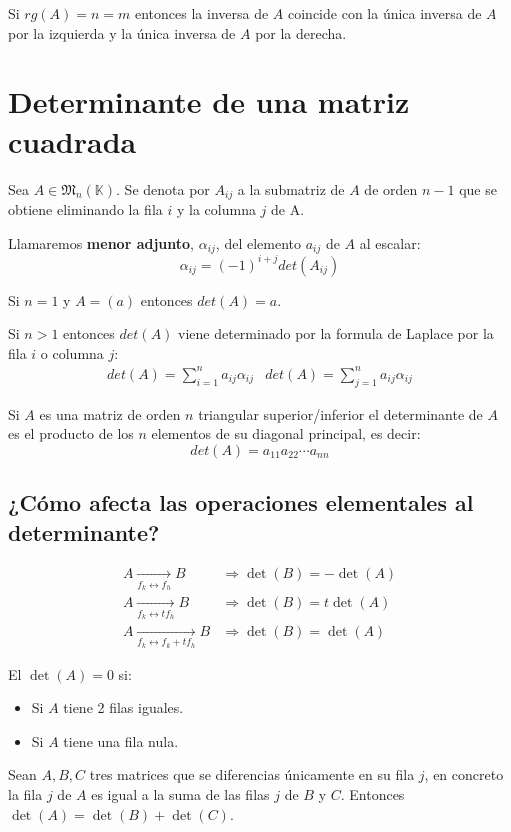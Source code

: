 Si $rg(A)=n=m$ entonces la inversa de $A$ coincide con la única inversa de $A$ por la izquierda y la única inversa de $A$ por la derecha.

\section{Determinante de una matriz cuadrada}

Sea $A \in \mathfrak{M}_n(\mathbb{K})$. Se denota por $A_{ij}$ a la submatriz de $A$ de orden $n-1$ que se obtiene eliminando la fila $i$ y la columna $j$ de A.

Llamaremos \textbf{menor adjunto}, $\alpha_{ij}$, del elemento $a_{ij}$ de $A$ al escalar:
\[
\alpha_{ij} = (-1)^{i+j}det(A_{ij})
\]

Si $n=1$ y $A=(a)$ entonces $det(A)=a$.

Si $n>1$ entonces $det(A)$ viene determinado por la formula de Laplace por la fila $i$ o columna $j$:
\begin{align*}
det(A) = \sum_{i=1}^{n} a_{ij}\alpha_{ij} & det(A) = \sum_{j=1}^{n} a_{ij}\alpha_{ij}
\end{align*}

Si $A$ es una matriz de orden $n$ triangular superior/inferior el determinante de $A$ es el producto de los $n$ elementos de su diagonal principal, es decir:
\[
det(A)=a_{11}a_{22} \cdots a_{nn}
\]

\subsection{¿Cómo afecta las operaciones elementales al determinante?}
\begin{align*}
A \xrightarrow[f_k \leftrightarrow f_h]{} B &\Rightarrow \det(B) = -\det(A) \\
A \xrightarrow[f_k \leftrightarrow t f_h]{} B &\Rightarrow \det(B) = t \det(A) \\
A \xrightarrow[f_k \leftrightarrow f_k + t f_h]{} B &\Rightarrow \det(B) = \det(A)
\end{align*}

El $\det(A)=0$ si:
\begin{itemize}
\item Si $A$ tiene 2 filas iguales.
\item Si $A$ tiene una fila nula.
\end{itemize}

Sean $A, B, C$ tres matrices que se diferencias únicamente en su fila $j$, en concreto la fila $j$ de $A$ es igual a la suma de las filas $j$ de $B$ y $C$. Entonces $\det(A)=\det(B)+\det(C)$.

